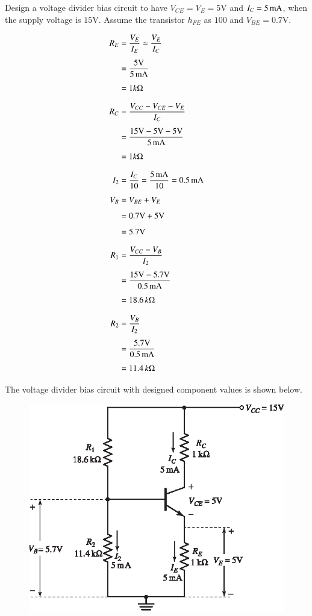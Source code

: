 \begin{example}\label{exam4.18}
Design a voltage divider bias circuit to have $V_{CE}=V_{E}=5\text{V}$ and $I_{C}=5\text{\,mA}$, when the supply voltage is $15\text{V}$. Assume the transistor $h_{FE}$ as $100$ and $V_{BE}=0.7\text{V}$.
\end{example}

\begin{solution}
\begin{align*}
R_{E} &= \frac{V_{E}}{I_{E}}\simeq \frac{V_{E}}{I_{C}}\\[4pt]
&= \frac{5\text{V}}{5\text{\,mA}}\\[4pt]
&= 1 k\Omega\\[7pt]
R_{C} &= \frac{V_{CC}-V_{CE}-V_{E}}{I_{C}}\\[4pt]
&= \frac{15\text{V}-5\text{V}-5\text{V}}{5\text{\,mA}}\\[4pt]
&= 1 k\Omega\\[7pt]
I_{2} &= \frac{I_{C}}{10}=\frac{5\text{\,mA}}{10}=0.5\text{\,mA}\\[4pt]
V_{B} &= V_{BE}+V_{E}\\[4pt]
&= 0.7\text{V}+5\text{V}\\[4pt]
&= 5.7\text{V}\\[7pt]
R_{1} &= \frac{V_{CC}-V_{B}}{I_{2}}\\[4pt]
&= \frac{15\text{V}-5.7\text{V}}{0.5\text{\,mA}}\\[4pt]
&= 18.6\,k\Omega\\[7pt]
R_{2} &= \frac{V_{B}}{I_{2}}\\[4pt]
&= \frac{5.7\text{V}}{0.5\text{\,mA}}\\[4pt]
&= 11.4\,k\Omega
\end{align*}

The voltage divider bias circuit with designed component values is shown below.
\begin{figure}[H]
\centering
\includegraphics[scale=1.05]{chap3/S3-EE-03-IN029.eps}
\end{figure}
\vskip -1cm
\end{solution}

